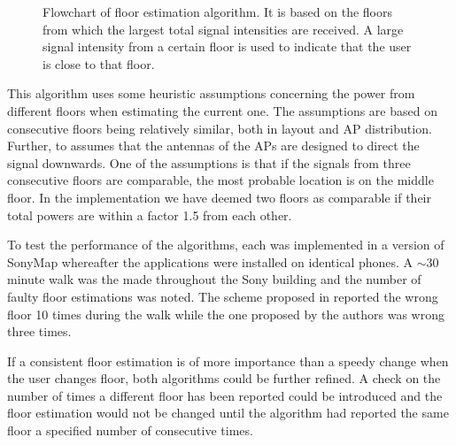 \documentclass{LTHthesis}
\begin{document}
\begin{figure}[width=10 cm, height = 15cm]
  \caption{Flowchart of floor estimation algorithm. It is based on the floors from which the largest total signal intensities are received. A large signal intensity from a certain floor is used to indicate that the user is close to that floor.} \label{flowchart}
\end{figure}

This algorithm uses some heuristic assumptions concerning the power from different floors when estimating the current one. The assumptions are based on consecutive floors being relatively similar, both in layout and AP distribution. Further, to assumes that the antennas of the APs are designed to direct the signal downwards. One of the assumptions is that if the signals from three consecutive floors are comparable, the most probable location is on the middle floor. In the implementation we have deemed two floors as comparable if their total powers are within a factor 1.5 from each other.  

To test the performance of the algorithms, each was implemented in a version of SonyMap whereafter the applications were installed on identical phones. A $\sim$30 minute walk was the made throughout the Sony building and the number of faulty floor estimations was noted. The scheme proposed in \cite{floor_det} reported the wrong floor 10 times during the walk while the one proposed by the authors was wrong three times. 

If a consistent floor estimation is of more importance than a speedy change when the user changes floor, both algorithms could be further refined. A check on the number of times a different floor has been reported could be introduced and the floor estimation would not be changed until the algorithm had reported the same floor a specified number of consecutive times.    
\end{document}
